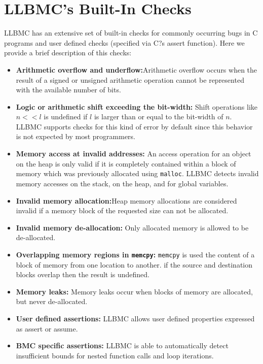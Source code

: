 \documentclass[14pt]{article}
\begin{document}
\section{LLBMC's Built-In Checks}\label{LLBMC?s Built-In Checks} LLBMC has an extensive set of built-in checks for commonly occurring bugs in C programs and user defined checks (specified via C?s assert function). Here we provide a brief description of this checks:
\begin{itemize}
  \item \textbf{Arithmetic overflow and underflow:}Arithmetic overflow occurs when the result of a signed or unsigned arithmetic operation cannot be represented with the available number of bits.
\item \textbf{Logic or arithmetic shift exceeding the bit-width:} Shift operations like  \(n << l\)  is undefined if  \(l \) is larger than or equal to the bit-width of  \(n\). LLBMC supports checks for this kind of error by default since this behavior is not expected by most programmers.
\item \textbf{Memory access at invalid addresses:} An access operation for an object on the heap is only valid if it is completely contained within a block of memory which was previously allocated using \texttt{malloc}. LLBMC detects invalid memory accesses on the stack, on the heap, and for global variables.
\item \textbf{Invalid memory allocation:}Heap memory allocations are considered invalid if a memory block of the requested size can not be allocated. 
\item \textbf{Invalid memory de-allocation:} Only allocated memory is allowed to be de-allocated.
\item \textbf{Overlapping memory regions in \texttt{memcpy}:}  \texttt{memcpy} is used the content of a block of memory from one location to another. if the source and destination blocks overlap then the result is undefined.
\item \textbf{Memory leaks:} Memory leaks occur when blocks of memory are allocated, but never de-allocated.
\item \textbf{User defined assertions:} LLBMC allows user defined properties expressed as assert or assume. 
\item \textbf{BMC specific assertions:} LLBMC is able to automatically detect insufficient bounds for nested function calls and loop iterations.

\end{itemize}
\end{document}
